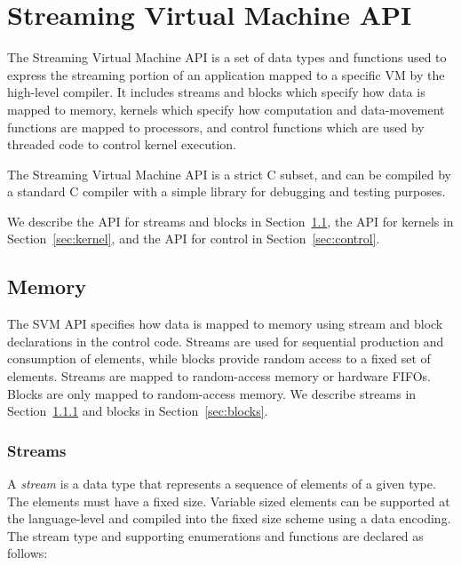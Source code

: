 \section{Streaming Virtual Machine API}

The Streaming Virtual Machine API is a set of data types and functions used to express the streaming portion of an application mapped to a specific VM by the high-level compiler. It includes streams and blocks which specify how data is mapped to memory, kernels which specify how computation and data-movement functions are mapped to processors, and control functions which are used by threaded code to control kernel execution.

The Streaming Virtual Machine API is a strict C subset, and can be compiled by a standard C compiler with 
a simple library for debugging and testing purposes.

We describe the API for streams and blocks in Section~\ref{sec:memory}, the API for kernels in Section~\ref{sec:kernel}, and the API for control in Section~\ref{sec:control}.

\subsection{Memory}
\label{sec:memory}

The SVM API specifies how data is mapped to memory using stream and block declarations in the control code.  Streams are used for sequential production and consumption of elements, while blocks provide random access to a fixed set of elements.  Streams are mapped to random-access memory or hardware FIFOs. Blocks are only mapped to random-access memory. We describe streams in Section~\ref{sec:streams} and blocks in Section~\ref{sec:blocks}.

\subsubsection{Streams}
\label{sec:streams}

A {\it stream} is a data type that represents a sequence of elements of a given type. 
The elements must have a fixed size. Variable sized elements can be supported at the language-level and compiled into the fixed size scheme using a data encoding. The stream type and supporting enumerations and functions are declared as follows:

